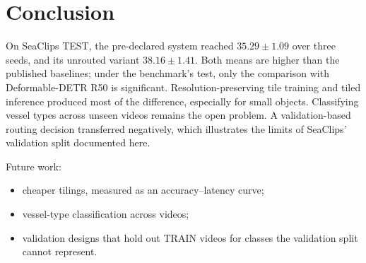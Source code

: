 \section{Conclusion}\label{sec:conclusion}

On SeaClips TEST, the pre-declared system reached $35.29 \pm 1.09$ \mapthree{} over three seeds, and its unrouted variant $38.16 \pm 1.41$. Both means are higher than the published baselines; under the benchmark's test, only the comparison with Deformable-DETR R50 is significant. Resolution-preserving tile training and tiled inference produced most of the difference, especially for small objects. Classifying vessel types across unseen videos remains the open problem. A validation-based routing decision transferred negatively, which illustrates the limits of SeaClips' validation split documented here.

Future work:
\begin{itemize}
\item cheaper tilings, measured as an accuracy--latency curve;
\item vessel-type classification across videos;
\item validation designs that hold out TRAIN videos for classes the validation split cannot represent.
\end{itemize}
